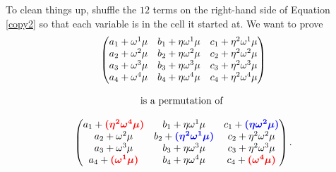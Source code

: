 To clean things up, shuffle the \(12\) terms on the right-hand side of
Equation \eqref{copy2} so that each variable is in the cell it
started at. We want to prove 
\begin{equation}
\label{copy3}
\begin{array}{c}
\begin{pmatrix}
a_{1} + \omega^{1}\mu & b_{1} + \eta\omega^{1}\mu & c_{1} + \eta^{2}\omega^{1}\mu \\
a_{2} + \omega^{2}\mu & b_{2} + \eta\omega^{2}\mu & c_{2} + \eta^{2}\omega^{2}\mu \\
a_{3} + \omega^{3}\mu & b_{3} + \eta\omega^{3}\mu & c_{3} + \eta^{2}\omega^{3}\mu \\
a_{4} + \omega^{4}\mu & b_{4} + \eta\omega^{4}\mu & c_{4} + \eta^{2}\omega^{4}\mu
\end{pmatrix} \\ \\
\text{is a permutation of } \\ \\
\begin{pmatrix}
a_{1} + \textcolor{red}{\boldsymbol{({\eta^{2}\omega^{4}\mu})}} & b_{1} + \eta\omega^{1}\mu & c_{1} + \textcolor{blue}{\boldsymbol{({\eta\omega^{2}\mu})}} \\
a_{2} + \omega^{2}\mu & b_{2} + \textcolor{blue}{\boldsymbol{({\eta^{2}\omega^{1}\mu})}} & c_{2} + \eta^{2}\omega^{2}\mu \\
a_{3} + \omega^{3}\mu & b_{3} + \eta\omega^{3}\mu & c_{3} + \eta^{2}\omega^{3}\mu \\
a_{4} + \textcolor{red}{\boldsymbol{({\omega^{1}\mu})}} & b_{4} + \eta\omega^{4}\mu & c_{4} + \textcolor{red}{\boldsymbol{({\omega^{4}\mu})}}
\end{pmatrix}.
\end{array}
\end{equation}

